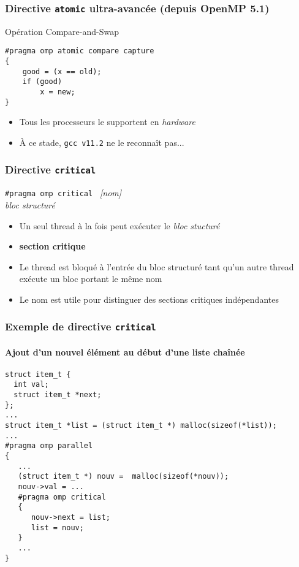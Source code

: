 \documentclass{beamer}
\begin{document}
\begin{frame}[fragile]
  \frametitle{Directive {\tt atomic} ultra-avancée (depuis OpenMP 5.1)} 

  \begin{block}{Opération \og Compare-and-Swap\fg{}}
\begin{verbatim}
#pragma omp atomic compare capture
{
    good = (x == old);
    if (good)
        x = new; 
}
\end{verbatim}
  \end{block}

  \begin{itemize}
  \item Tous les processeurs le supportent en \emph{hardware}
  \item À ce stade, \texttt{gcc v11.2} ne le reconnaît pas...
  \end{itemize}
  
\end{frame}



\begin{frame}
  \frametitle{Directive {\tt critical}} 

\begin{framed}
  {\tt \#pragma omp critical } {\it [nom]}  \\
  {\it bloc structuré} 
\end{framed}


\bigskip

\begin{itemize}
\item Un seul thread à la fois peut exécuter le \textit{bloc stucturé}

\item \og \textbf{section critique}\fg
    
\item Le thread est bloqué à l'entrée du bloc structuré tant qu'un autre
  thread exécute un bloc portant le même nom
  
\item Le nom est utile pour distinguer des sections critiques indépendantes
\end{itemize}


  
\end{frame}



\begin{frame}[fragile]
  \frametitle{Exemple de directive {\tt critical}}
  \framesubtitle{Ajout d'un nouvel élément au début d'une liste chaînée}

\begin{verbatim}
struct item_t {
  int val;
  struct item_t *next;
};
...
struct item_t *list = (struct item_t *) malloc(sizeof(*list)); 
...
#pragma omp parallel 
{ 
   ...
   (struct item_t *) nouv =  malloc(sizeof(*nouv));
   nouv->val = ...
   #pragma omp critical 
   {
      nouv->next = list;
      list = nouv;
   }
   ...
}
\end{verbatim}
\end{frame}
\end{document}
